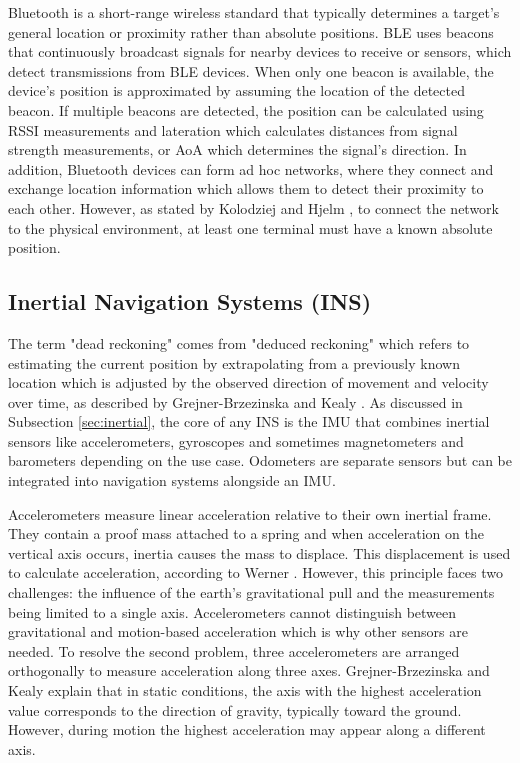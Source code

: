 Bluetooth is a short-range wireless standard that typically determines a target's general location or proximity rather than absolute positions.
\ac{BLE} uses beacons that continuously broadcast signals for nearby devices to receive or sensors, which detect transmissions from \acs{BLE} devices.
When only one beacon is available, the device's position is approximated by assuming the location of the detected beacon. 
If multiple beacons are detected, the position can be calculated using \ac{RSSI} measurements and lateration which calculates distances from signal strength measurements, or \acs{AoA} which determines the signal's direction.
In addition, Bluetooth devices can form ad hoc networks, where they connect and exchange location information which allows them to detect their proximity to each other. 
However, as stated by Kolodziej and Hjelm \cite{kolodziej2017local}, to connect the network to the physical environment, at least one terminal must have a known absolute position.

\subsection{Inertial Navigation Systems (INS)}
\label{sec:ins}
The term "dead reckoning" comes from "deduced reckoning" which refers to estimating the current position by extrapolating from a previously known location which is adjusted by the observed direction of movement and velocity over time, as described by Grejner-Brzezinska and Kealy \cite{grejner2004positioning}.
As discussed in Subsection \ref{sec:inertial}, the core of any \acs{INS} is the \acs{IMU} that combines inertial sensors like accelerometers, gyroscopes and sometimes magnetometers and barometers depending on the use case. 
Odometers are separate sensors but can be integrated into navigation systems alongside an \acs{IMU}.

Accelerometers measure linear acceleration relative to their own inertial frame.
They contain a proof mass attached to a spring and when acceleration on the vertical axis occurs, inertia causes the mass to displace.
This displacement is used to calculate acceleration, according to Werner \cite{werner2014indoor}.
However, this principle faces two challenges: the influence of the earth's gravitational pull and the measurements being limited to a single axis.
Accelerometers cannot distinguish between gravitational and motion-based acceleration which is why other sensors are needed.
To resolve the second problem, three accelerometers are arranged orthogonally to measure acceleration along three axes.
Grejner-Brzezinska and Kealy \cite{grejner2004positioning} explain that in static conditions, the axis with the highest acceleration value corresponds to the direction of gravity, typically toward the ground. 
However, during motion the highest acceleration may appear along a different axis.

